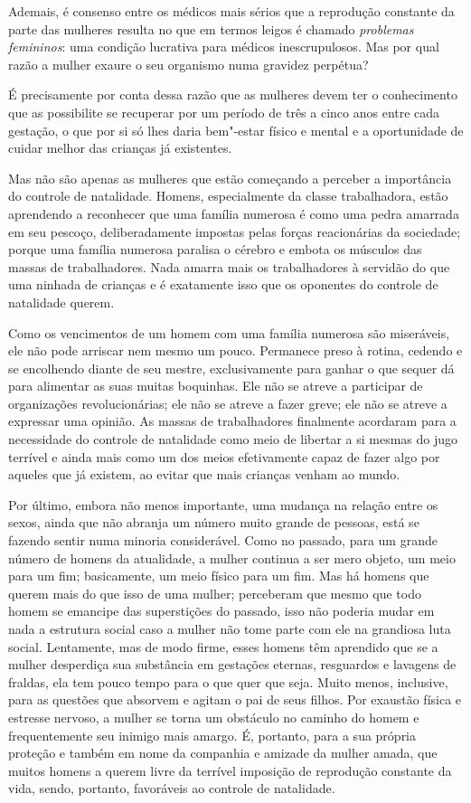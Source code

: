Ademais, é consenso entre os médicos mais sérios que a reprodução\label{saude}
constante da parte das mulheres resulta no que em termos leigos é
chamado \textit{problemas femininos}: uma condição lucrativa para médicos
inescrupulosos. Mas por qual razão a mulher exaure o seu organismo numa
gravidez perpétua?

É precisamente por conta dessa razão que as mulheres devem ter o
conhecimento que as possibilite se recuperar por um período de três a
cinco anos entre cada gestação, o que por si só lhes daria bem"-estar
físico e mental e a oportunidade de cuidar melhor das crianças já
existentes.

Mas não são apenas as mulheres que estão começando a perceber a
importância do controle de natalidade. Homens, especialmente da classe
trabalhadora, estão aprendendo a reconhecer que uma família numerosa é
como uma pedra amarrada em seu pescoço, deliberadamente impostas
pelas forças reacionárias da sociedade; porque uma família numerosa
paralisa o cérebro e embota os músculos das massas de trabalhadores.
Nada amarra mais os trabalhadores à servidão do que uma ninhada de
crianças e é exatamente isso que os oponentes do controle de natalidade
querem.

Como os vencimentos de um homem com uma família numerosa são miseráveis,
ele não pode arriscar nem mesmo um pouco. Permanece preso à
rotina, cedendo e se encolhendo diante de seu mestre, exclusivamente para
ganhar o que sequer dá para alimentar as suas muitas boquinhas. Ele não se
atreve a participar de organizações revolucionárias; ele não se atreve a
fazer greve; ele não se atreve a expressar uma opinião. As massas de
trabalhadores finalmente acordaram para a necessidade do controle de
natalidade como meio de libertar a si mesmas do jugo terrível e ainda
mais como um dos meios efetivamente capaz de fazer algo por aqueles que já existem, ao evitar que mais crianças venham ao mundo.

Por último, embora não menos importante, uma mudança na relação entre os
sexos, ainda que não abranja um número muito grande de pessoas, está se
fazendo sentir numa minoria considerável. Como no passado, para um
grande número de homens da atualidade, a mulher continua a ser mero
objeto, um meio para um fim; basicamente, um meio físico para um fim.
Mas há homens que querem mais do que isso de uma mulher; perceberam que
mesmo que todo homem se emancipe das superstições do passado, isso não
poderia mudar em nada a estrutura social caso a mulher não tome parte
com ele na grandiosa luta social. Lentamente, mas de modo firme, esses
homens têm aprendido que se a mulher desperdiça sua substância em
gestações eternas, resguardos e lavagens de fraldas, ela tem pouco tempo
para o que quer que seja. Muito menos, inclusive, para as questões que
absorvem e agitam o pai de seus filhos. Por exaustão física e estresse
nervoso, a mulher se torna um obstáculo no caminho do homem e
frequentemente seu inimigo mais amargo. É, portanto, para a sua própria
proteção e também em nome da companhia e amizade da mulher amada, que
muitos homens a querem livre da terrível imposição de reprodução
constante da vida, sendo, portanto, favoráveis ao controle de
natalidade.

